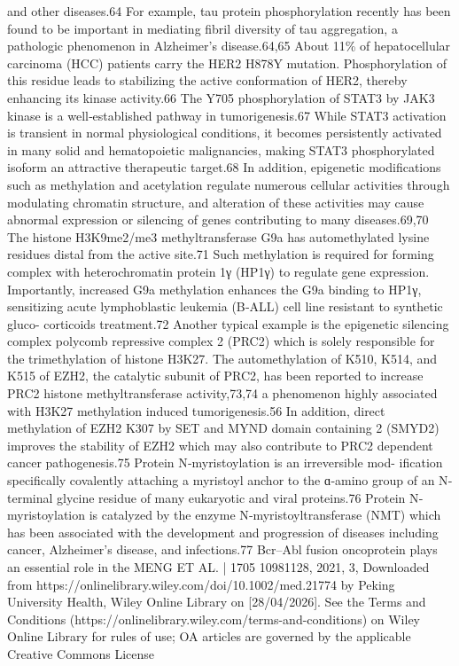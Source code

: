 and other diseases.64 For example, tau protein phosphorylation recently has been found to be important in
mediating fibril diversity of tau aggregation, a pathologic phenomenon in Alzheimer's disease.64,65 About 11\% of
hepatocellular carcinoma (HCC) patients carry the HER2 H878Y mutation. Phosphorylation of this residue leads to
stabilizing the active conformation of HER2, thereby enhancing its kinase activity.66 The Y705 phosphorylation of
STAT3 by JAK3 kinase is a well‐established pathway in tumorigenesis.67 While STAT3 activation is transient in
normal physiological conditions, it becomes persistently activated in many solid and hematopoietic malignancies,
making STAT3 phosphorylated isoform an attractive therapeutic target.68
In addition, epigenetic modifications such as methylation and acetylation regulate numerous cellular activities
through modulating chromatin structure, and alteration of these activities may cause abnormal expression or
silencing of genes contributing to many diseases.69,70 The histone H3K9me2/me3 methyltransferase G9a has
automethylated lysine residues distal from the active site.71 Such methylation is required for forming complex with
heterochromatin protein 1γ (HP1γ) to regulate gene expression. Importantly, increased G9a methylation enhances
the G9a binding to HP1γ, sensitizing acute lymphoblastic leukemia (B‐ALL) cell line resistant to synthetic gluco-
corticoids treatment.72 Another typical example is the epigenetic silencing complex polycomb repressive complex 2
(PRC2) which is solely responsible for the trimethylation of histone H3K27. The automethylation of K510, K514,
and K515 of EZH2, the catalytic subunit of PRC2, has been reported to increase PRC2 histone methyltransferase
activity,73,74 a phenomenon highly associated with H3K27 methylation induced tumorigenesis.56 In addition, direct
methylation of EZH2 K307 by SET and MYND domain containing 2 (SMYD2) improves the stability of EZH2 which
may also contribute to PRC2 dependent cancer pathogenesis.75 Protein N‐myristoylation is an irreversible mod-
ification specifically covalently attaching a myristoyl anchor to the ɑ‐amino group of an N‐terminal glycine
residue of many eukaryotic and viral proteins.76 Protein N‐myristoylation is catalyzed by the enzyme
N‐myristoyltransferase (NMT) which has been associated with the development and progression of diseases
including cancer, Alzheimer's disease, and infections.77 Bcr–Abl fusion oncoprotein plays an essential role in the
MENG ET AL.
| 1705
 10981128, 2021, 3, Downloaded from https://onlinelibrary.wiley.com/doi/10.1002/med.21774 by Peking University Health, Wiley Online Library on [28/04/2026]. See the Terms and Conditions (https://onlinelibrary.wiley.com/terms-and-conditions) on Wiley Online Library for rules of use; OA articles are governed by the applicable Creative Commons License
